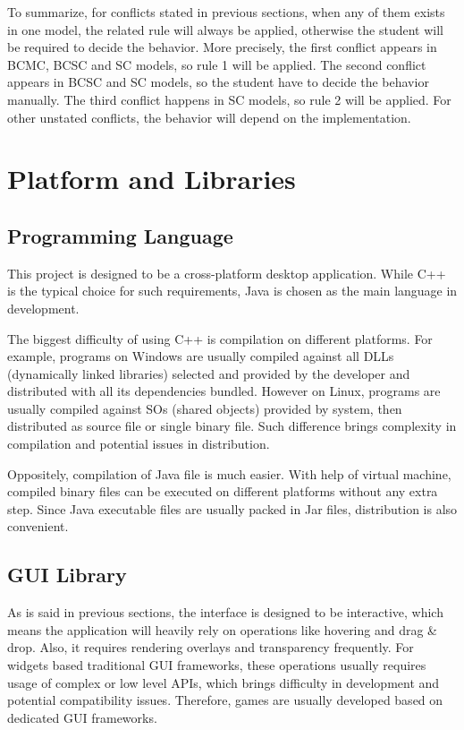 \documentclass[msc,deptreport, cs]{infthesis}
\begin{document}
To summarize, for conflicts stated in previous sections, when any of them exists in one model, the related rule will always be applied, otherwise the student will be required to decide the behavior. More precisely, the first conflict appears in BCMC, BCSC and SC models, so rule 1 will be applied. The second conflict appears in BCSC and SC models, so the student have to decide the behavior manually. The third conflict happens in SC models, so rule 2 will be applied. For other unstated conflicts, the behavior will depend on the implementation.

\section{Platform and Libraries}

\subsection{Programming Language}

This project is designed to be a cross-platform desktop application. While C++ is the typical choice for such requirements, Java is chosen as the main language in development. 

The biggest difficulty of using C++ is compilation on different platforms. For example, programs on Windows are usually compiled against all DLLs (dynamically linked libraries) selected and provided by the developer and distributed with all its dependencies bundled. However on Linux, programs are usually compiled against SOs (shared objects) provided by system, then distributed as source file or single binary file. Such difference brings complexity in compilation and potential issues in distribution.

Oppositely, compilation of Java file is much easier. With help of virtual machine, compiled binary files can be executed on different platforms without any extra step. Since Java executable files are usually packed in Jar files, distribution is also convenient.

\subsection{GUI Library} \label{sec:opengl}

As is said in previous sections, the interface is designed to be interactive, which means the application will heavily rely on operations like hovering and drag \& drop. Also, it requires rendering overlays and transparency frequently. For widgets based traditional GUI frameworks, these operations usually requires usage of complex or low level APIs, which brings difficulty in development and potential compatibility issues. Therefore, games are usually developed based on dedicated GUI frameworks.
\end{document}
